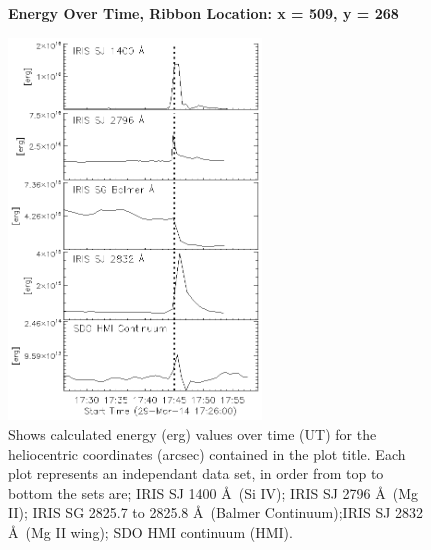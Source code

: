 \begin{figure}[H]
  \begin{center}
  \textbf{Energy Over Time, Ribbon Location: x = 509, y = 268 }\par\medskip
  \includegraphics[width=0.6\textwidth]{29-Mar-14-Ribbon-xyPosition-509-268-Frame-1-Energy-Ladder}
  \end{center}
  \caption{Shows calculated energy (erg) values over time (UT) for the heliocentric coordinates (arcsec) contained in the plot title. Each plot represents an independant data set, in order from top to bottom the sets are; IRIS SJ 1400 \AA\ (Si IV); IRIS SJ 2796 \AA\ (Mg II); IRIS SG  2825.7 to 2825.8 \AA\ (Balmer Continuum);IRIS SJ 2832 \AA\ (Mg II wing); SDO HMI continuum (HMI).}\label{erb9}
\end{figure}

